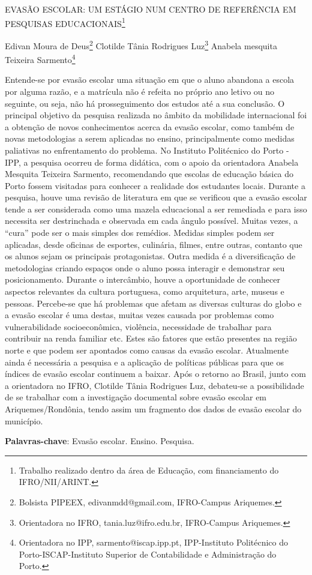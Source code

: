 \documentclass[article,12pt,onesidea,4paper,english,brazil]{abntex2}
\begin{document}
	
	
	\frenchspacing 
	
	\begin{center}
		\LARGE EVASÃO ESCOLAR: UM ESTÁGIO NUM CENTRO DE REFERÊNCIA EM PESQUISAS EDUCACIONAIS\footnote{Trabalho realizado dentro da área de Educação, com financiamento do IFRO/NII/ARINT.}
		
		\normalsize
	Edivan Moura de Deus\footnote{Bolsista PIPEEX, edivanmdd@gmail.com, IFRO-Campus Ariquemes.} 
	Clotilde Tânia Rodrigues Luz\footnote{Orientadora no IFRO, tania.luz@ifro.edu.br, IFRO-Campus Ariquemes.} 
	Anabela mesquita Teixeira Sarmento\footnote{Orientadora no IPP, sarmento@iscap.ipp.pt, IPP-Instituto Politécnico do Porto-ISCAP-Instituto Superior de Contabilidade e Administração do Porto.} 
	\end{center}
	
	\noindent Entende-se por evasão escolar uma situação em que o aluno abandona a escola por alguma razão, e a matrícula não é refeita no próprio ano letivo ou no seguinte, ou seja, não há prosseguimento dos estudos até a sua conclusão. O principal objetivo da pesquisa realizada no âmbito da mobilidade internacional foi a obtenção de novos conhecimentos acerca da evasão escolar, como também de novas metodologias a serem aplicadas no ensino, principalmente como medidas paliativas no enfrentamento do problema. No Instituto Politécnico do Porto - IPP, a pesquisa ocorreu de forma didática, com o apoio da orientadora Anabela Mesquita Teixeira Sarmento, recomendando que escolas de educação básica do Porto fossem visitadas para conhecer a realidade dos estudantes locais. Durante a pesquisa, houve uma revisão de literatura em que se verificou que a evasão escolar tende a ser considerada como uma mazela educacional a ser remediada e para isso necessita ser destrinchada e observada em cada ângulo possível. Muitas vezes, a “cura” pode ser o mais simples dos remédios. Medidas simples podem ser aplicadas, desde oficinas de esportes, culinária, filmes, entre outras, contanto que os alunos sejam os principais protagonistas. Outra medida é a diversificação de metodologias criando espaços onde o aluno possa interagir e demonstrar seu posicionamento. Durante o intercâmbio, houve a oportunidade de conhecer aspectos relevantes da cultura portuguesa, como arquitetura, arte, museus e pessoas. Percebe-se que há problemas que afetam as diversas culturas do globo e a evasão escolar é uma destas, muitas vezes causada por problemas como vulnerabilidade socioeconômica, violência, necessidade de trabalhar para contribuir na renda familiar etc. Estes são fatores que estão presentes na região norte e que podem ser apontados como causas da evasão escolar. Atualmente ainda é necessária a pesquisa e a aplicação de políticas públicas para que os índices de evasão escolar continuem a baixar. Após o retorno ao Brasil, junto com a orientadora no IFRO, Clotilde Tânia Rodrigues Luz, debateu-se a possibilidade de se trabalhar com a investigação documental sobre evasão escolar em Ariquemes/Rondônia, tendo assim um fragmento dos dados de evasão escolar do município.
	
	\vspace{\onelineskip}
	
	\noindent
	\textbf{Palavras-chave}: Evasão escolar. Ensino. Pesquisa.
	
\end{document}
